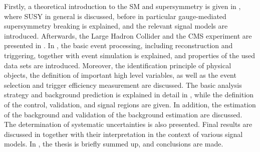 Firstly, a theoretical introduction to the SM and supersymmetry is given in , where SUSY in general is discussed, before in particular gauge-mediated supersymmetry breaking is explained, and the relevant signal models are introduced. Afterwards, the Large Hadron Collider and the CMS experiment are presented in . In , the basic event processing, including reconstruction and triggering, together with event simulation is explained, and properties of the used data sets are introduced. Moreover, the identification principle of physical objects, the definition of important high level variables, as well as the event selection and trigger efficiency measurement are discussed. The basic analysis strategy and background prediction is explained in detail in , while the definition of the control, validation, and signal regions are given. In addition, the estimation of the background and validation of the background estimation are discussed. The determination of systematic uncertainties is also presented. Final results are discussed in  together with their interpretation in the context of various signal models. In , the thesis is briefly summed up, and conclusions are made.
